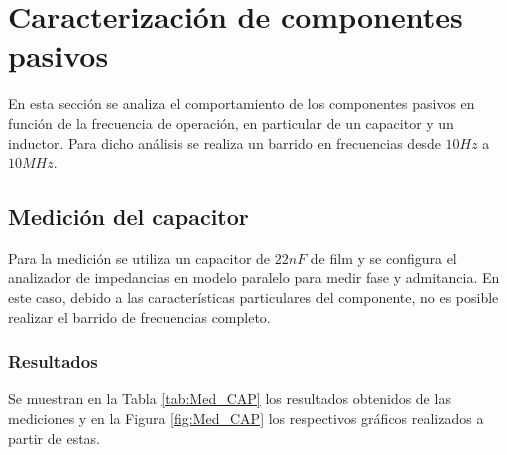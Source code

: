 


\section{Caracterizaci\'on de componentes pasivos}
En esta secci\'on se analiza el comportamiento de los componentes pasivos en funci\'on de la frecuencia de operaci\'on, en particular de un capacitor y un inductor.
Para dicho an\'alisis se realiza un barrido en frecuencias desde $10Hz$ a $10MHz$.

\subsection{Medici\'on del capacitor}
Para la medici\'on se utiliza un capacitor de $22nF$ de film y se configura el analizador de impedancias en modelo paralelo para medir fase y admitancia. En este caso, debido a las caracter\'isticas particulares del componente, no es posible realizar el barrido de frecuencias completo.
\subsubsection{Resultados}
Se muestran en la Tabla \ref{tab:Med_CAP}  los resultados obtenidos de las mediciones y en la Figura \ref{fig:Med_CAP} los respectivos  gr\'aficos realizados a partir de estas.

